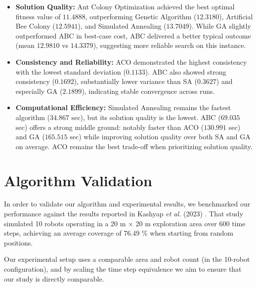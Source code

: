 \begin{itemize}
    \item \textbf{Solution Quality:} 
    Ant Colony Optimization achieved the best optimal fitness value of $11.4888$, outperforming Genetic Algorithm ($12.3180$), Artificial Bee Colony ($12.5941$), and Simulated Annealing ($13.7049$). While GA slightly outperformed ABC in best-case cost, ABC delivered a better typical outcome (mean $12.9810$ vs $14.3379$), suggesting more reliable search on this instance.

    \item \textbf{Consistency and Reliability:}
    ACO demonstrated the highest consistency with the lowest standard deviation ($0.1133$). ABC also showed strong consistency ($0.1692$), substantially lower variance than SA ($0.3627$) and especially GA ($2.1899$), indicating stable convergence across runs.

    \item \textbf{Computational Efficiency:}
    Simulated Annealing remains the fastest algorithm ($34.867$ sec), but its solution quality is the lowest. ABC ($69.035$ sec) offers a strong middle ground: notably faster than ACO ($130.991$ sec) and GA ($165.515$ sec) while improving solution quality over both SA and GA on average. ACO remains the best trade-off when prioritizing solution quality.
\end{itemize}

\section{Algorithm Validation}

In order to validate our algorithm and experimental results, we benchmarked our performance against the results reported in Kashyap \textit{et al.} (2023) \cite{kashyap2025simulations}. That study simulated 10 robots operating in a 20 m × 20 m exploration area over 600 time steps, achieving an average coverage of 76.49 \% when starting from random positions. 

Our experimental setup uses a comparable area and robot count (in the 10-robot configuration), and by scaling the time step equivalence we aim to ensure that our study is directly comparable.

